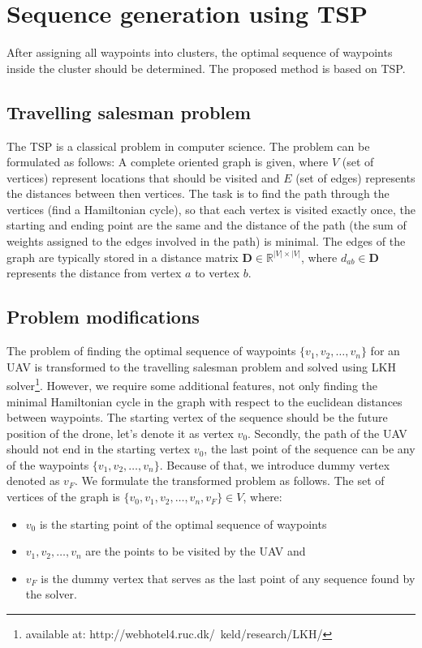 \section{Sequence generation using TSP}%

After assigning all waypoints into clusters, the optimal sequence of waypoints inside the cluster should be determined.
The proposed method is based on \ac{TSP}.
\subsection{Travelling salesman problem}
The \ac{TSP} is a classical problem in computer science. 
The problem can be formulated as follows: 
A complete oriented graph is given, where $V$ (set of vertices) represent locations that should be visited and $E$ (set of edges) represents the distances between then vertices.
The task is to find the path through the vertices (find a Hamiltonian cycle), so that each vertex is visited exactly once, the starting and ending point are the same and the distance of the path (the sum of weights assigned to the edges involved in the path) is minimal.
The edges of the graph are typically stored in a distance matrix $\mathbf{D}\in \mathbb{R}^{\left|V\right|\times\left|V\right|}$, where $d_{ab} \in \mathbf{D}$ represents the distance from vertex $a$ to vertex $b$.

\subsection{Problem modifications}
The problem of finding the optimal sequence of waypoints $\{v_{1}, v_{2}, \dots , v_{n}\}$ for an \ac{UAV} is transformed to the travelling salesman problem and solved using LKH solver\footnote{available at: http://webhotel4.ruc.dk/~keld/research/LKH/}.
However, we require some additional features, not only finding the minimal Hamiltonian cycle in the graph with respect to the euclidean distances between waypoints.
The starting vertex of the sequence should be the future position of the drone, let's denote it as vertex $v_{0}$.
Secondly, the path of the \ac{UAV} should not end in the starting vertex $v_{0}$, the last point of the sequence can be any of the waypoints $\{v_{1}, v_{2}, \dots, v_{n}\}$.
Because of that, we introduce dummy vertex denoted as $v_{F}$.
We formulate the transformed problem as follows.
The set of vertices of the graph is $\{v_{0}, v_{1}, v_{2}, \dots,v_{n}, v_{F}\} \in V$, where: 
\begin{itemize}
  \item $v_{0}$ is the starting point of the optimal sequence of waypoints
  \item $v_{1}, v_{2}, \dots, v_{n}$ are the points to be visited by the \ac{UAV} and   
  \item $v_{F}$ is the dummy vertex that serves as the last point of any sequence found by the solver.
\end{itemize}

